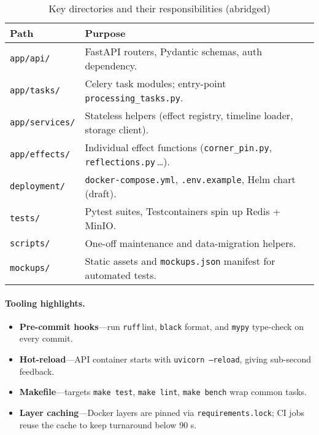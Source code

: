\begin{table}[htbp]
  \centering
  \scriptsize
  \caption{Key directories and their responsibilities (abridged)}
  \label{tab:repo-tree}
  \begin{tabularx}{\textwidth}{@{}l X@{}}
    \toprule
    \textbf{Path} & \textbf{Purpose} \\
    \midrule
    \texttt{app/api/}       & FastAPI routers, Pydantic schemas, auth dependency. \\
    \texttt{app/tasks/}     & Celery task modules; entry-point \texttt{processing\_tasks.py}. \\
    \texttt{app/services/}  & Stateless helpers (effect registry, timeline loader, storage client). \\
    \texttt{app/effects/}   & Individual effect functions (\texttt{corner\_pin.py}, \texttt{reflections.py}\,…). \\
    \texttt{deployment/}    & \texttt{docker-compose.yml}, \texttt{.env.example}, Helm chart (draft). \\
    \texttt{tests/}         & Pytest suites, Testcontainers spin up Redis + MinIO. \\
    \texttt{scripts/}       & One-off maintenance and data-migration helpers. \\
    \texttt{mockups/}       & Static assets and \texttt{mockups.json} manifest for automated tests. \\
    \bottomrule
  \end{tabularx}
\end{table}

\paragraph{Tooling highlights.}
\begin{itemize}
  \item \textbf{Pre-commit hooks}—run \texttt{ruff}\,lint, \texttt{black} format,
        and \texttt{mypy} type-check on every commit.
  \item \textbf{Hot-reload}—API container starts with
        \texttt{uvicorn --reload}, giving sub-second feedback.
  \item \textbf{Makefile}—targets \texttt{make test}, \texttt{make lint},
        \texttt{make bench} wrap common tasks.
  \item \textbf{Layer caching}—Docker layers are pinned via
        \texttt{requirements.lock}; CI jobs reuse the cache to keep turnaround
        below 90 s.
\end{itemize}

